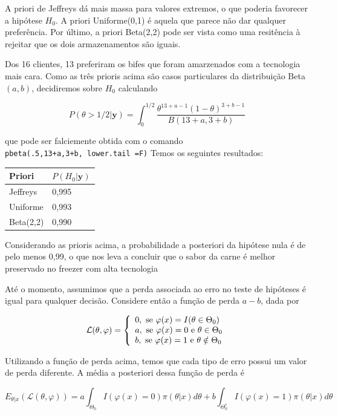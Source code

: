 \documentclass[
  letterpaper,
  DIV=11,
  numbers=noendperiod]{scrreprt}
\theoremstyle{definition}
\theoremstyle{definition}
\theoremstyle{plain}
\theoremstyle{remark}
\begin{document}
A priori de Jeffreys dá mais massa para valores extremos, o que poderia
favorecer a hipótese \(H_0\). A priori Uniforme(0,1) é aquela que parece
não dar qualquer preferência. Por último, a priori Beta(2,2) pode ser
vista como uma resitência à rejeitar que os dois armazenamentos são
iguais.

Dos 16 clientes, 13 preferiram os bifes que foram amarzenados com a
tecnologia mais cara. Como as três prioris acima são casos particulares
da distribuição Beta\((a,b)\), decidiremos sobre \(H_0\) calculando

\[P(\theta>1/2|\textbf{y})=\int_0^{1/2}\frac{\theta^{13+a-1}(1-\theta)^{3+b-1}}{B(13+a,3+b)}\]

que pode ser falciemente obtida com o comando
\texttt{pbeta(.5,13+a,3+b,\ lower.tail\ =F)} Temos os seguintes
resultados:

\begin{longtable}[]{@{}ll@{}}
\toprule\noalign{}
Priori & \(P(H_0|\textbf{y})\) \\
\midrule\noalign{}
\endhead
\bottomrule\noalign{}
\endlastfoot
Jeffreys & 0,995 \\
Uniforme & 0,993 \\
Beta(2,2) & 0,990 \\
\end{longtable}

Considerando as prioris acima, a probabilidade a posteriori da hipótese
nula é de pelo menos 0,99, o que nos leva a concluir que o sabor da
carne é melhor preservado no freezer com alta tecnologia

Até o momento, assumimos que a perda associada ao erro no teste de
hipóteses é igual para qualquer decisão. Considere então a função de
perda \(a-b\), dada por

\[\mathcal{L}(\theta,\varphi)=\left\{\begin{array}{l}0,\hbox{ se }\varphi(x)=I(\theta\in\Theta_0)\\
a,\hbox{ se }\varphi(x)=0\hbox{ e }\theta\in\Theta_0\\b,\hbox{ se }\varphi(x)=1\hbox{ e }\theta\notin\Theta_0\end{array}\right.\]

Utilizando a função de perda acima, temos que cada tipo de erro possui
um valor de perda diferente. A média a posteriori dessa função de perda
é

\[E_{\theta|x}(\mathcal{L}(\theta,\varphi))=a\int_{\Theta_0}I(\varphi(x)=0)\pi(\theta|x)d\theta+b\int_{\Theta_0^c}I(\varphi(x)=1)\pi(\theta|x)d\theta\]
\end{document}
